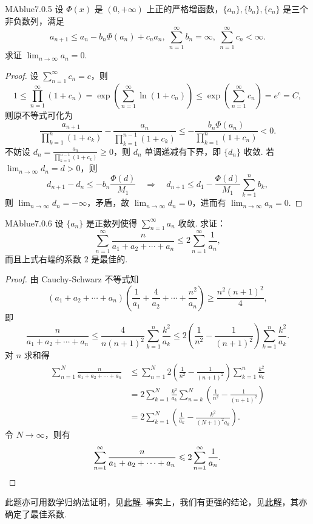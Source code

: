 \begin{problem}{MAblue}{7.0.5}
    设 $\Phi(x)$ 是 $(0, +\infty)$ 上正的严格增函数，$\{ a_n \}, \{ b_n \}, \{ c_n \}$ 是三个非负数列，满足
    \[
        a_{n+1} \leqslant a_n - b_n \Phi(a_n) + c_na_n,\ \sum_{n=1}^\infty b_n = \infty,\ \sum_{n=1}^\infty c_n < \infty.
    \]
    求证 $\lim_{n \to \infty} a_n = 0$.
\end{problem}

\begin{proof}
    设 $\sum_{n=1}^\infty c_n = c$，则
    \[
        1 \leqslant \prod_{n=1}^{\infty} (1 + c_n) = \exp\left( \sum_{n=1}^{\infty} \ln(1 + c_n) \right) \leqslant \exp\left( \sum_{n=1}^{\infty} c_n \right) = e^c = C,
    \]
    则原不等式可化为
    \[
        \frac{a_{n+1}}{\prod_{k=1}^n (1+c_k)} - \frac{a_n}{\prod_{k=1}^{n-1} (1+c_k)} \leqslant - \frac{b_n \Phi(a_n)}{\prod_{k=1}^n (1+c_n)} < 0.
    \]
    不妨设 $d_n = \frac{a_n}{\prod_{k=1}^{n-1} (1+c_k)} \geqslant 0$，则 $d_n$ 单调递减有下界，即 $\{ d_n \}$ 收敛. 若 $\lim_{n \to \infty} d_n = d > 0$，则
    \[
        d_{n+1} - d_n \leqslant -b_n \frac{\Phi(d)}{M_1} \quad \Rightarrow \quad d_{n+1} \leqslant d_1 - \frac{\Phi(d)}{M_1} \sum_{k=1}^{n} b_k,
    \]
    则 $\lim_{n \to \infty} d_n = -\infty$，矛盾，故 $\lim_{n \to \infty} d_n = 0$，进而有 $\lim_{n \to \infty} a_n = 0$.
\end{proof}

\begin{problem}{MAblue}{7.0.6}
    设 $\{ a_n \}$ 是正数列使得 $\sum_{n=1}^\infty a_n$ 收敛. 求证：
    \[
        \sum_{n=1}^\infty \frac n {a_1 + a_2 + \cdots + a_n} \leqslant 2 \sum_{n=1}^\infty \frac 1 {a_n},
    \]
    而且上式右端的系数 $2$ 是最佳的.
\end{problem}

\begin{proof}
    由 Cauchy-Schwarz 不等式知
    \[
        (a_1 + a_2 + \cdots + a_n)\left( \frac 1 {a_1} + \frac 4 {a_2} + \cdots + \frac{n^2}{a_n} \right) \geqslant \frac {n^2(n+1)^2} 4,
    \]
    即
    \[
        \frac n {a_1 + a_2 + \cdots + a_n} \leqslant \frac 4 {n(n+1)^2} \sum_{k=1}^n \frac{k^2}{a_k} \leqslant  2 \left( \frac 1 {n^2} - \frac 1 {(n+1)^2} \right) \sum_{k=1}^n \frac{k^2}{a_k}.
    \]
    对 $n$ 求和得
    \begin{align*}
        \sum_{n=1}^N \frac n {a_1 + a_2 + \cdots + a_n} &\leqslant \sum_{n=1}^N 2 \left( \frac 1 {n^2} - \frac 1 {(n+1)^2} \right) \sum_{k=1}^n \frac{k^2}{a_k} \\
        &= 2 \sum_{k=1}^N \frac{k^2}{a_k} \sum_{n=k}^N \left( \frac 1 {n^2} - \frac 1 {(n+1)^2} \right) \\
        &= 2 \sum_{k=1}^N \left( \frac 1 {a_k} - \frac{k^2}{(N+1)^2 a_k} \right).
    \end{align*}
    令 $N \to \infty$，则有
    \[
        \sum_{n=1}^{\infty} \frac n {a_1 + a_2 + \cdots + a_n} \leqslant 2 \sum_{n=1}^{\infty} \frac 1 {a_n}. \qedhere
    \]
\end{proof}
{\flushleft 此题亦可用数学归纳法证明，见\href{https://math.stackexchange.com/posts/108598/revisions}{此解}. 事实上，我们有更强的结论，见\href{https://www.komal.hu/feladat?a=feladat&f=A709&l=en}{此解}，其亦确定了最佳系数.}

